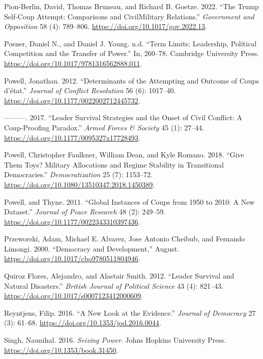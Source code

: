 \documentclass[
  12pt,
]{report}
\newlength{\cslhangindent}
\newenvironment{CSLReferences}[2] %
 {\begin{list}{}{%
  \setlength{\itemindent}{0pt}
  \setlength{\leftmargin}{0pt}
  \setlength{\parsep}{0pt}
  \ifodd #1
   \setlength{\leftmargin}{\cslhangindent}
   \setlength{\itemindent}{-1\cslhangindent}
  \fi
  \setlength{\itemsep}{#2\baselineskip}}}
 {\end{list}}
\begin{document}
\begin{CSLReferences}{1}{0}
Pion-Berlin, David, Thomas Bruneau, and Richard B. Goetze. 2022. {``The
Trump Self-Coup Attempt: Comparisons and Civil{\textendash}Military
Relations.''} \emph{Government and Opposition} 58 (4): 789--806.
\url{https://doi.org/10.1017/gov.2022.13}.

Posner, Daniel N., and Daniel J. Young. n.d. {``Term Limits: Leadership,
Political Competition and the Transfer of Power.''} In, 260--78.
Cambridge University Press.
\url{https://doi.org/10.1017/9781316562888.011}.

Powell, Jonathan. 2012. {``Determinants of the Attempting and Outcome of
Coups d{'}état.''} \emph{Journal of Conflict Resolution} 56 (6):
1017--40. \url{https://doi.org/10.1177/0022002712445732}.

---------. 2017. {``Leader Survival Strategies and the Onset of Civil
Conflict: A Coup-Proofing Paradox.''} \emph{Armed Forces \& Society} 45
(1): 27--44. \url{https://doi.org/10.1177/0095327x17728493}.

Powell, Christopher Faulkner, William Dean, and Kyle Romano. 2018.
{``Give Them Toys? Military Allocations and Regime Stability in
Transitional Democracies.''} \emph{Democratization} 25 (7): 1153--72.
\url{https://doi.org/10.1080/13510347.2018.1450389}.

Powell, and Thyne. 2011. {``Global Instances of Coups from 1950 to 2010:
A New Dataset.''} \emph{Journal of Peace Research} 48 (2): 249--59.
\url{https://doi.org/10.1177/0022343310397436}.

Przeworski, Adam, Michael E. Alvarez, Jose Antonio Cheibub, and Fernando
Limongi. 2000. {``Democracy and Development,''} August.
\url{https://doi.org/10.1017/cbo9780511804946}.

Quiroz Flores, Alejandro, and Alastair Smith. 2012. {``Leader Survival
and Natural Disasters.''} \emph{British Journal of Political Science} 43
(4): 821--43. \url{https://doi.org/10.1017/s0007123412000609}.

Reyntjens, Filip. 2016. {``A New Look at the Evidence.''} \emph{Journal
of Democracy} 27 (3): 61--68.
\url{https://doi.org/10.1353/jod.2016.0044}.

Singh, Naunihal. 2016. \emph{Seizing Power}. Johns Hopkins University
Press. \url{https://doi.org/10.1353/book.31450}.


\end{CSLReferences}
\end{document}
